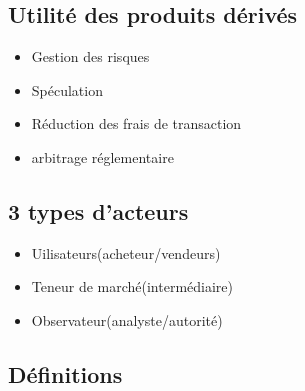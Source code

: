 \documentclass[]{book}
\providecommand{\tightlist}{%
  \setlength{\itemsep}{0pt}\setlength{\parskip}{0pt}}
\theoremstyle{definition}
\theoremstyle{definition}
\theoremstyle{definition}
\theoremstyle{remark}
\begin{document}
\subsection*{Utilité des produits
dérivés}\label{utilite-des-produits-derives}

\begin{itemize}
\tightlist
\item
  Gestion des risques
\item
  Spéculation
\item
  Réduction des frais de transaction
\item
  arbitrage réglementaire
\end{itemize}

\subsection*{3 types d'acteurs}\label{types-dacteurs}

\begin{itemize}
\tightlist
\item
  Uilisateurs(acheteur/vendeurs)
\item
  Teneur de marché(intermédiaire)
\item
  Observateur(analyste/autorité)
\end{itemize}

\subsection*{Définitions}\label{definitions-1}
\end{document}
